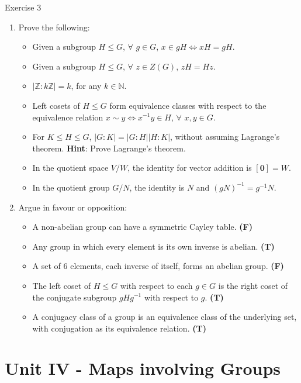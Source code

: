 \documentclass{beamer}
\begin{document}
\begin{frame}{Exercise 3}
    \begin{enumerate}
        \item Prove the following:
        \begin{itemize}
            \item Given a subgroup $H\leq G$, $\forall$ $g\in G$, $x\in gH\iff xH=gH$.
            \item Given a subgroup $H\leq G$, $\forall$ $z\in Z(G)$, $zH=Hz$.
            \item $\lvert\mathbb{Z}:k\mathbb{Z}\rvert=k$, for any $k\in\mathbb{N}$.
            \item Left cosets of $H\leq G$ form equivalence classes with respect to the equivalence relation $x\sim y\iff x^{-1}y\in H$, $\forall$ $x,y\in G$.
            \item For $K\leq H\leq G$, $\lvert G:K\rvert=\lvert G:H\rvert\lvert H:K\rvert$, without assuming Lagrange's theorem. \textbf{Hint}: Prove Lagrange's theorem.
            \item In the quotient space $V/W$, the identity for vector addition is $[\mathbf{0}]=W$.
            \item In the quotient group $G/N$, the identity is $N$ and $(gN)^{-1}=g^{-1}N$.
        \end{itemize}
        \item Argue in favour or opposition:
        \begin{itemize}
            \item A non-abelian group can have a symmetric Cayley table. \textbf{(F)}
            \item Any group in which every element is its own inverse is abelian. \textbf{(T)}
            \item A set of 6 elements, each inverse of itself, forms an abelian group. \textbf{(F)}
            \item The left coset of $H\leq G$ with respect to each $g\in G$ is the right coset of the conjugate subgroup $gHg^{-1}$ with respect to $g$. \textbf{(T)}
            \item A conjugacy class of a group is an equivalence class of the underlying set, with conjugation as its equivalence relation. \textbf{(T)}
        \end{itemize}
    \end{enumerate}
\end{frame}

\section{Unit IV - Maps involving Groups}
\end{document}
